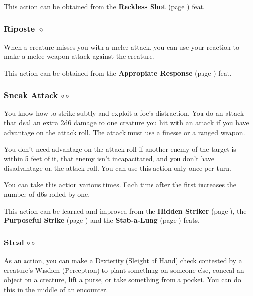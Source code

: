         This action can be obtained from the \textbf{Reckless Shot} (page \pageref{feat::recklessshot}) feat.
    \subsubsection{Riposte $\diamond$} \label{act::riposte}
        When a creature misses you with a melee attack, you can use your reaction to make a melee weapon attack against the creature.

        This action can be obtained from the \textbf{Appropiate Response} (page \pageref{feat::appropiateresponse}) feat.
    \subsubsection{Sneak Attack $\circ\circ$} \label{act::sneakattack}
        You know how to strike subtly and exploit a foe's distraction.
        You do an attack that deal an extra 2d6 damage to one creature you hit with an attack if you have advantage on the attack roll.
        The attack must use a finesse or a ranged weapon.

        You don't need advantage on the attack roll if another enemy of the target is within 5 feet of it, that enemy isn't incapacitated, and you don't have disadvantage on the attack roll.
        You can use this action only once per turn.

        You can take this action various times.
        Each time after the first increases the number of d6s rolled by one.

        This action can be learned and improved from the \textbf{Hidden Striker} (page \pageref{feat::hiddenstriker}), the \textbf{Purposeful Strike} (page \pageref{feat::purposefulstrike}) and the \textbf{Stab-a-Lung} (page \pageref{feat::stabalung}) feats.
    \subsubsection{Steal $\circ\circ$} \label{act::steal}
        As an action, you can make a Dexterity (Sleight of Hand) check contested by a creature's Wisdom (Perception) to plant something on someone else, conceal an object on a creature, lift a purse, or take something from a pocket.
        You can do this in the middle of an encounter.

